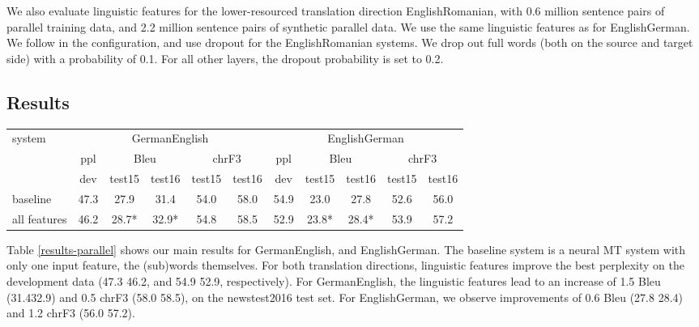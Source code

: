 \documentclass[11pt]{article}
\begin{document}
We also evaluate linguistic features for the lower-resourced translation direction EnglishRomanian, with 0.6 million sentence pairs of parallel training data, and 2.2 million sentence pairs of synthetic parallel data.
We use the same linguistic features as for EnglishGerman.
We follow  in the configuration, and use dropout for the EnglishRomanian systems.
We drop out full words (both on the source and target side) with a probability of 0.1.
For all other layers, the dropout probability is set to 0.2.

\subsection{Results}

\begin{table*}
\centering
\small
\begin{tabular}{l|c|cc|cc||c|cc|cc}
\multirow{3}{*}{system} & \multicolumn{5}{c||}{GermanEnglish} & \multicolumn{5}{c}{EnglishGerman}\\
& ppl  & \multicolumn{2}{c|}{{\sc Bleu} } & \multicolumn{2}{c||}{{\sc chrF3} } & ppl  & \multicolumn{2}{c|}{{\sc Bleu} } & \multicolumn{2}{c}{{\sc chrF3} }\\
& dev & test15 & test16  & test15 & test16 & dev & test15 & test16  & test15 & test16\\
\hline
baseline & 47.3 & 27.9\phantom{*} & 31.4\phantom{*} & 54.0 & 58.0 & 54.9 & 23.0\phantom{*} & 27.8\phantom{*} & 52.6 & 56.0\\ all features & 46.2 & 28.7* & 32.9* & 54.8 & 58.5 & 52.9 & 23.8* & 28.4* & 53.9 & 57.2\\ \end{tabular}
\caption{GermanEnglish translation results: best perplexity on dev (newstest2013), and {\sc Bleu} and {\sc chrF3} on test15 (newstest2015) and test16 (newstest2016). {\sc Bleu} scores that are significantly different (p < 0.05) from respective baseline are marked with (*).}
\label{results-parallel}
\end{table*}

Table \ref{results-parallel} shows our main results for GermanEnglish, and EnglishGerman.
The baseline system is a neural MT system with only one input feature, the (sub)words themselves.
For both translation directions, linguistic features improve the best perplexity on the development data (47.3  46.2, and 54.9  52.9, respectively).
For GermanEnglish, the linguistic features lead to an increase of 1.5 {\sc Bleu} (31.432.9) and 0.5 {\sc chrF3} (58.0  58.5), on the newstest2016 test set.
For EnglishGerman, we observe improvements of 0.6 {\sc Bleu} (27.8  28.4) and 1.2 {\sc chrF3} (56.0  57.2).
\end{document}
